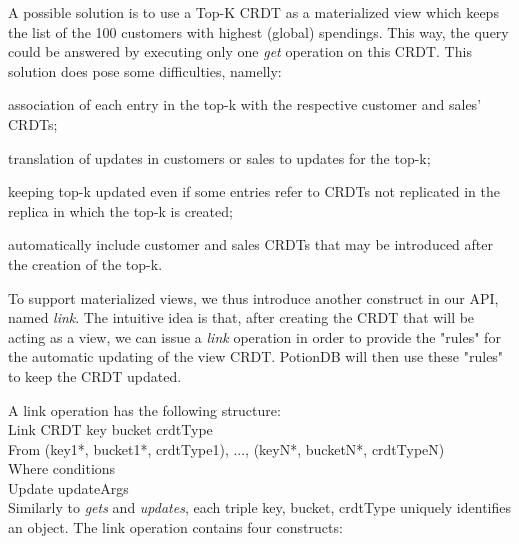 \documentclass{vldb}
\begin{document}
A possible solution is to use a Top-K CRDT %
as a materialized view which keeps the list of the 100 customers with highest (global) spendings.
This way, the query could be answered by executing only one \emph{get} operation on this CRDT.
This solution does pose some difficulties, namelly: 
\begin{enumerate*}[label=(\roman*)]
	\item association of each entry in the top-k with the respective customer and sales' CRDTs;
	\item translation of updates in customers or sales to updates for the top-k;
	\item keeping top-k updated even if some entries refer to CRDTs not replicated in the replica in which the top-k is created;
	\item automatically include customer and sales CRDTs that may be introduced after the creation of the top-k.
\end{enumerate*}

To support materialized views, we thus introduce another construct in our API, named \emph{link}.
The intuitive idea is that, after creating the CRDT that will be acting as a view, we can issue a \emph{link} operation in order to provide the "rules" for the automatic updating of the view CRDT.
PotionDB will then use these "rules" to keep the CRDT updated.

A link operation has the following structure:
\\

Link CRDT key bucket crdtType \\
From (key1*, bucket1*, crdtType1), ..., (keyN*, bucketN*, crdtTypeN) \\
Where conditions \\
Update updateArgs \\


Similarly to \emph{gets} and \emph{updates}, each triple key, bucket, crdtType uniquely identifies an object.
The link operation contains four constructs:
\end{document}
